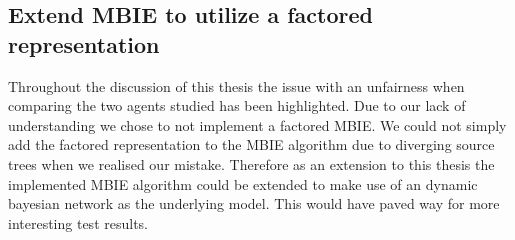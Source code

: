 \subsection{Extend MBIE to utilize a factored representation}
\label{sec:factored_mbie}

Throughout the discussion of this thesis the issue with an unfairness when
comparing the two agents studied has been highlighted. Due to our lack of
understanding we chose to not implement a factored MBIE. We could not simply
add the factored representation to the MBIE algorithm due to diverging source
trees when we realised our mistake. Therefore as an extension to this thesis
the implemented MBIE algorithm could be extended to make use of an dynamic
bayesian network as the underlying model. This would have paved way for more
interesting test results.
